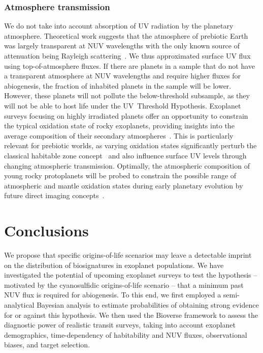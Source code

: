 \documentclass[twocolumn,twocolappendix,linenumbers]{aastex631}
\begin{document}
\subsubsection{Atmosphere transmission}
We do not take into account absorption of UV radiation by the planetary atmosphere.
Theoretical work suggests that the atmosphere of prebiotic Earth was largely transparent at \gls{NUV} wavelengths with the only known source of attenuation being Rayleigh scattering~\citep{Ranjan2017,Ranjan2017c}.
We thus approximated surface UV flux using top-of-atmosphere fluxes.
If there are planets in a sample that do not have a transparent atmosphere at \gls{NUV} wavelengths and require higher fluxes for abiogenesis, the fraction of inhabited planets in the sample will be lower.
However, these planets will not pollute the below-threshold subsample, as they will not be able to host life under the UV~Threshold Hypothesis.
Exoplanet surveys focusing on highly irradiated planets offer an opportunity to constrain the typical oxidation state of rocky exoplanets, providing insights into the average composition of their secondary atmospheres~\citep{Lichtenberg2024}.
This is particularly relevant for prebiotic worlds, as varying oxidation states significantly perturb the classical habitable zone concept~\citep{Nicholls2024} and also influence surface \gls{UV} levels through changing atmospheric transmission.
Optimally, the atmospheric composition of young rocky protoplanets will be probed to constrain the possible range of atmospheric and mantle oxidation states during early planetary evolution by future direct imaging concepts~\citep{Cesario2024}.



\section{Conclusions}
\label{sec:conclusions}
We propose that specific origins-of-life scenarios may leave a detectable imprint on the distribution of biosignatures in exoplanet populations.
We have investigated the potential of upcoming exoplanet surveys to test the hypothesis -- motivated by the cyanosulfidic origins-of-life scenario -- that a minimum past \gls{NUV} flux is required for abiogenesis.
To this end, we first employed a semi-analytical Bayesian analysis to estimate probabilities of obtaining strong evidence for or against this hypothesis.
We then used the Bioverse framework to assess the diagnostic power of realistic transit surveys, taking into account exoplanet demographics, time-dependency of habitability and \gls{NUV} fluxes, observational biases, and target selection.
\end{document}
